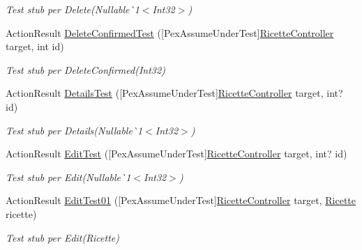 \begin{DoxyCompactItemize}
\begin{DoxyCompactList}\small\item\em Test stub per Delete(Nullable\`{}1$<$Int32$>$)\end{DoxyCompactList}\item 
Action\+Result \mbox{\hyperlink{class_brew_day2_1_1_controllers_1_1_tests_1_1_ricette_controller_test_a9d30c617c3d811d1e71c24fbb5cec687}{Delete\+Confirmed\+Test}} (\mbox{[}Pex\+Assume\+Under\+Test\mbox{]}\mbox{\hyperlink{class_brew_day2_1_1_controllers_1_1_ricette_controller}{Ricette\+Controller}} target, int id)
\begin{DoxyCompactList}\small\item\em Test stub per Delete\+Confirmed(\+Int32)\end{DoxyCompactList}\item 
Action\+Result \mbox{\hyperlink{class_brew_day2_1_1_controllers_1_1_tests_1_1_ricette_controller_test_a5febace1c04be580e160e9e76ff19dd9}{Details\+Test}} (\mbox{[}Pex\+Assume\+Under\+Test\mbox{]}\mbox{\hyperlink{class_brew_day2_1_1_controllers_1_1_ricette_controller}{Ricette\+Controller}} target, int? id)
\begin{DoxyCompactList}\small\item\em Test stub per Details(Nullable\`{}1$<$Int32$>$)\end{DoxyCompactList}\item 
Action\+Result \mbox{\hyperlink{class_brew_day2_1_1_controllers_1_1_tests_1_1_ricette_controller_test_acc12e51a1c1314393c980d9c642941b9}{Edit\+Test}} (\mbox{[}Pex\+Assume\+Under\+Test\mbox{]}\mbox{\hyperlink{class_brew_day2_1_1_controllers_1_1_ricette_controller}{Ricette\+Controller}} target, int? id)
\begin{DoxyCompactList}\small\item\em Test stub per Edit(Nullable\`{}1$<$Int32$>$)\end{DoxyCompactList}\item 
Action\+Result \mbox{\hyperlink{class_brew_day2_1_1_controllers_1_1_tests_1_1_ricette_controller_test_a17ffb0513ba9d12c358fe7ef99df6918}{Edit\+Test01}} (\mbox{[}Pex\+Assume\+Under\+Test\mbox{]}\mbox{\hyperlink{class_brew_day2_1_1_controllers_1_1_ricette_controller}{Ricette\+Controller}} target, \mbox{\hyperlink{class_brew_day2_1_1_models_1_1_ricette}{Ricette}} ricette)
\begin{DoxyCompactList}\small\item\em Test stub per Edit(\+Ricette)\end{DoxyCompactList}\item 

\end{DoxyCompactItemize}
